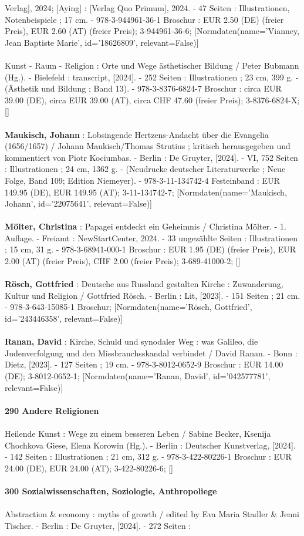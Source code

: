 \documentclass{article}
\begin{document}
\begin{multicols}{3}
Verlag], 2024; [Aying] : [Verlag Quo Primum], 2024. - 47 Seiten : Illustrationen, Notenbeispiele ; 17 cm. - 978-3-944961-36-1 Broschur : EUR 2.50 (DE) (freier Preis), EUR 2.60 (AT) (freier Preis); 3-944961-36-6; [Normdaten(name='Vianney, Jean Baptiste Marie', id='18626809', relevant=False)]\\\\Kunst - Raum - Religion : Orte und Wege ästhetischer Bildung / Peter Bubmann (Hg.). - Bielefeld : transcript, [2024]. - 252 Seiten : Illustrationen ; 23 cm, 399 g. - (Ästhetik und Bildung ; Band 13). - 978-3-8376-6824-7 Broschur : circa EUR 39.00 (DE), circa EUR 39.00 (AT), circa CHF 47.60 (freier Preis); 3-8376-6824-X; []\\\\\textbf{Maukisch, Johann} : Lobsingende Hertzens-Andacht über die Evangelia (1656/1657) / Johann Maukisch/Thomas Strutius ; kritisch herausgegeben und kommentiert von Piotr Kociumbas. - Berlin : De Gruyter, [2024]. - VI, 752 Seiten : Illustrationen ; 24 cm, 1362 g. - (Neudrucke deutscher Literaturwerke ; Neue Folge, Band 109; Edition Niemeyer). - 978-3-11-134742-4 Festeinband : EUR 149.95 (DE), EUR 149.95 (AT); 3-11-134742-7; [Normdaten(name='Maukisch, Johann', id='22075641', relevant=False)]\\\\\textbf{Mölter, Christina} : Papagei entdeckt ein Geheimnis / Christina Mölter. - 1. Auflage. - Freiamt : NewStartCenter, 2024. - 33 ungezählte Seiten : Illustrationen ; 15 cm, 31 g. - 978-3-68941-000-1 Broschur : EUR 1.95 (DE) (freier Preis), EUR 2.00 (AT) (freier Preis), CHF 2.00 (freier Preis); 3-689-41000-2; []\\\\\textbf{Rösch, Gottfried} : Deutsche aus Russland gestalten Kirche : Zuwanderung, Kultur und Religion / Gottfried Rösch. - Berlin : Lit, [2023]. - 151 Seiten ; 21 cm. - 978-3-643-15085-1 Broschur; [Normdaten(name='Rösch, Gottfried', id='243446358', relevant=False)]\\\\\textbf{Ranan, David} : Kirche, Schuld und synodaler Weg : was Galileo, die Judenverfolgung und den Missbrauchsskandal verbindet / David Ranan. - Bonn : Dietz, [2023]. - 127 Seiten ; 19 cm. - 978-3-8012-0652-9 Broschur : EUR 14.00 (DE); 3-8012-0652-1; [Normdaten(name='Ranan, David', id='042577781', relevant=False)]\\\\\textbf{290 Andere Religionen}\\\\Heilende Kunst : Wege zu einem besseren Leben / Sabine Becker, Ksenija Chochkova Giese, Elena Korowin (Hg.). - Berlin : Deutscher Kunstverlag, [2024]. - 142 Seiten : Illustrationen ; 21 cm, 312 g. - 978-3-422-80226-1 Broschur : EUR 24.00 (DE), EUR 24.00 (AT); 3-422-80226-6; []\\\\\textbf{300 Sozialwissenschaften, Soziologie, Anthropoliege}\\\\Abstraction \& economy : myths of growth / edited by Eva Maria Stadler \& Jenni Tischer. - Berlin : De Gruyter, [2024]. - 272 Seiten : 
\end{multicols}
\end{document}
